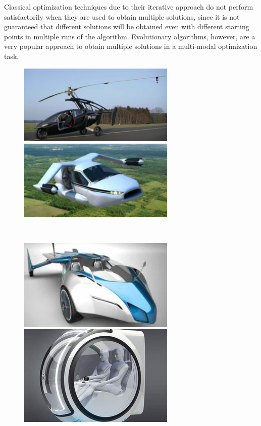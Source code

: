 Classical optimization techniques due to their iterative approach do not perform satisfactorily when they are used to obtain multiple solutions, since it is not guaranteed that different solutions will be obtained even with different starting points in multiple runs of the algorithm. Evolutionary algorithms, however, are a very popular approach to obtain multiple solutions in a multi-modal optimization task.

\begin{figure}[H]
\centering
\begin{minipage}[t]{0.48\textwidth}
\centering
\includegraphics[width=7.5cm]{pic/m3.png}
\end{minipage}
\begin{minipage}[t]{0.48\textwidth}
\centering
\includegraphics[width=7.5cm]{pic/m2.png}
\end{minipage}
\\[5mm]
\begin{minipage}[t]{0.48\textwidth}
\centering
\includegraphics[width=7.5cm]{pic/m1.png}
\end{minipage}
\begin{minipage}[t]{0.48\textwidth}
\centering
\includegraphics[width=7.5cm]{pic/m4.png}
\end{minipage}
\end{figure}

